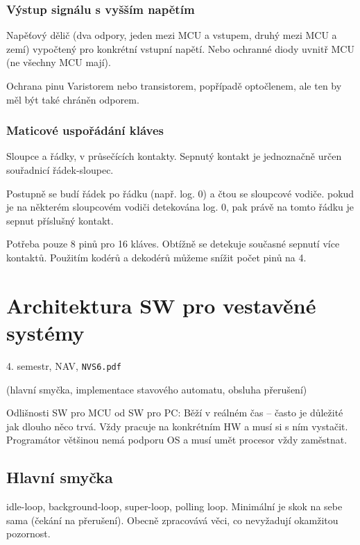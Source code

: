 \documentclass[a4paper, 11pt]{report}
\begin{document}
\subsection{Výstup signálu s vyšším napětím}
Napěťový dělič (dva odpory, jeden mezi MCU a vstupem, druhý mezi MCU a zemí) vypočtený pro konkrétní vstupní napětí. Nebo ochranné diody uvnitř MCU (ne všechny MCU mají).

Ochrana pinu Varistorem nebo transistorem, popřípadě optočlenem, ale ten by měl být také chráněn odporem.

\subsection{Maticové uspořádání kláves}
Sloupce a řádky, v průsečících kontakty. Sepnutý kontakt je jednoznačně určen souřadnicí řádek-sloupec.

Postupně se budí řádek po řádku (např. log. 0) a čtou se sloupcové vodiče. pokud je na některém sloupcovém vodiči detekována log. 0, pak právě na tomto řádku je sepnut příslušný kontakt.

Potřeba pouze 8 pinů pro 16 kláves. Obtížně se detekuje současné sepnutí více kontaktů. Použitím kodérů a dekodérů můžeme snížit počet pinů na 4.

\chapter{Architektura SW pro vestavěné systémy} \label{cha:61}
4. semestr, NAV, \texttt{NVS6.pdf}

(hlavní smyčka, implementace stavového automatu, obsluha přerušení)

Odlišnosti SW pro MCU od SW pro PC: Běží v reálném čas -- často je důležité jak dlouho něco trvá. Vždy pracuje na konkrétním HW a musí si s ním vystačit. Programátor většinou nemá podporu OS a musí umět procesor vždy zaměstnat.

\section{Hlavní smyčka}
idle-loop, background-loop, super-loop, polling loop. Minimální je skok na sebe sama (čekání na přerušení). Obecně zpracovává věci, co nevyžadují okamžitou pozornost.
\end{document}
